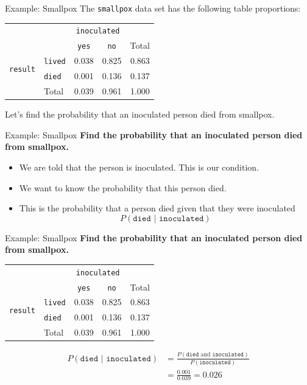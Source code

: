 \begin{frame}{Example: Smallpox}
    The \texttt{smallpox} data set has the following table proportions: 
    \begin{center}
        \begin{tabular}{r l cc r}
		& & \multicolumn{2}{c}{{\texttt{inoculated}}} & \\
        \cline{3-4}
		& & \texttt{yes} & \texttt{no} & Total  \\ 
        \cline{2-5}
        \multirow{2}{*}{{\texttt{result}}} 
        & \texttt{lived}    & 0.038 & 0.825 & 0.863 \\ 
  		& \texttt{died}     & 0.001 & 0.136 & 0.137 \\ 
        \cline{2-5}
  		& Total	            & 0.039 & 0.961 & 1.000 \\
        \cline{2-5}
    \end{tabular}
    \end{center}
    Let's find the probability that an inoculated person died from smallpox.
\end{frame}

\begin{frame}{Example: Smallpox}
    \textbf{Find the probability that an inoculated person died from smallpox.}
    
    \begin{itemize}
        \item We are told that the person is inoculated. This is our condition.
        \item We want to know the probability that this person died. 
        \item This is the probability that a person died given that they were inoculated
        \[
        P(\texttt{died }|\texttt{ inoculated})
        \]
    \end{itemize}
\end{frame}

\begin{frame}{Example: Smallpox}
    \textbf{Find the probability that an inoculated person died from smallpox.}
    \begin{center}
        \begin{tabular}{r l cc r}
		& & \multicolumn{2}{c}{{\texttt{inoculated}}} & \\
        \cline{3-4}
		& & \texttt{yes} & \texttt{no} & Total  \\ 
        \cline{2-5}
        \multirow{2}{*}{{\texttt{result}}} 
        & \texttt{lived}    & 0.038 & 0.825 & 0.863 \\ 
  		& \texttt{died}     & 0.001 & 0.136 & 0.137 \\ 
        \cline{2-5}
  		& Total	            & 0.039 & 0.961 & 1.000 \\
        \cline{2-5}
    \end{tabular}
    \end{center}
    \begin{align*}
        P(\texttt{died }|\texttt{ inoculated}) &= \frac{P(\texttt{died} \text{ and } \texttt{inoculated})} {P(\texttt{inoculated})} \\
        &= \frac{0.001}{0.039} = 0.026
    \end{align*}
\end{frame}

